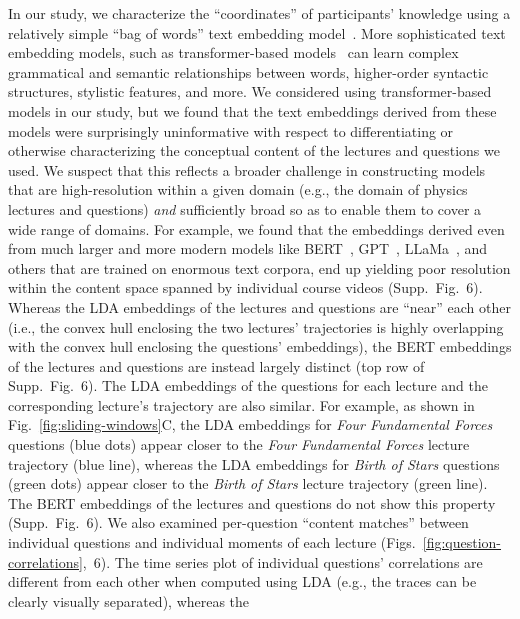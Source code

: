 \documentclass[10pt]{article}
\newcommand{\ldaVsBERT}{6}
\begin{document}
In our study, we characterize the ``coordinates'' of participants' knowledge
using a relatively simple ``bag of words'' text embedding model~\citep[LDA;
][]{BleiEtal03}. More sophisticated text embedding models, such as
transformer-based models~\citep{ViswEtal17, DevlEtal18, ChatGPT, TouvEtal23}
can learn complex grammatical and semantic relationships between words,
higher-order syntactic structures, stylistic features, and more. We considered
using transformer-based models in our study, but we found that the text
embeddings derived from these models were surprisingly uninformative with
respect to differentiating or otherwise characterizing the conceptual content
of the lectures and questions we used. We suspect that this reflects a broader
challenge in constructing models that are high-resolution within a given domain
(e.g., the domain of physics lectures and questions) \textit{and} sufficiently
broad so as to enable them to cover a wide range of domains. For example, we
found that the embeddings derived even from much larger and more modern models
like BERT~\citep{DevlEtal18}, GPT~\citep{ViswEtal17}, LLaMa~\citep{TouvEtal23},
and others that are trained on enormous text corpora, end up yielding poor
resolution within the content space spanned by individual course videos
(Supp.~Fig.~\ldaVsBERT). Whereas the LDA embeddings of the lectures and
questions are ``near'' each other (i.e., the convex hull enclosing the two
lectures' trajectories is highly overlapping with the convex hull enclosing the
questions' embeddings), the BERT embeddings of the lectures and questions are
instead largely distinct (top row of Supp.~Fig.~\ldaVsBERT). The LDA embeddings
of the questions for each lecture and the corresponding lecture's trajectory
are also similar. For example, as shown in Fig.~\ref{fig:sliding-windows}C, the
LDA embeddings for \textit{Four Fundamental Forces} questions (blue dots)
appear closer to the \textit{Four Fundamental Forces} lecture trajectory (blue
line), whereas the LDA embeddings for \textit{Birth of Stars} questions (green
dots) appear closer to the \textit{Birth of Stars} lecture trajectory (green
line). The BERT embeddings of the lectures and questions do not show this
property (Supp.~Fig.~\ldaVsBERT). We also examined per-question ``content
matches'' between individual questions and individual moments of each lecture
(Figs.~\ref{fig:question-correlations},~\ldaVsBERT). The time series plot of
individual questions' correlations are different from each other when computed
using LDA (e.g., the traces can be clearly visually separated), whereas the
\end{document}
